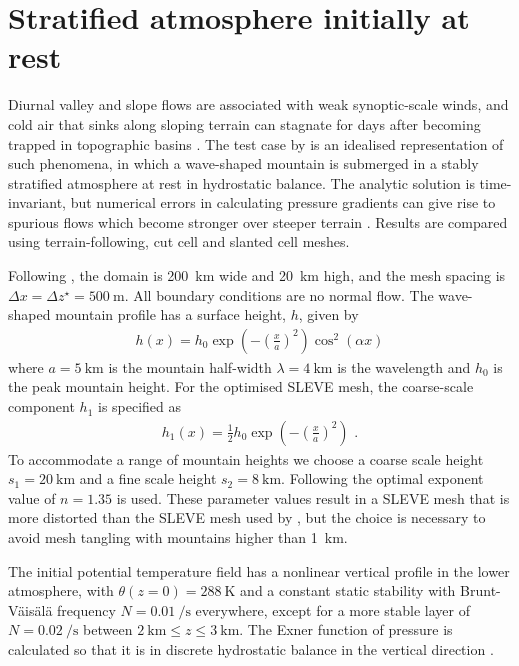 \section{Stratified atmosphere initially at rest}
\label{sec:slanted:resting}

Diurnal valley and slope flows are associated with weak synoptic-scale winds, and cold air that sinks along sloping terrain can stagnate for days after becoming trapped in topographic basins \citep{chow2013}.
The test case by \citet{klemp2011} is an idealised representation of such phenomena, in which a wave-shaped mountain is submerged in a stably stratified atmosphere at rest in hydrostatic balance.
The analytic solution is time-invariant, but numerical errors in calculating pressure gradients can give rise to spurious flows which become stronger over steeper terrain \citep{klemp2011}.
Results are compared using terrain-following, cut cell and slanted cell meshes.

Following \cite{klemp2011}, the domain is \SI{200}{\kilo\meter} wide and \SI{20}{\kilo\meter} high, and the mesh spacing is \(\Delta x = \Delta z^\star = \SI{500}{\meter}\).  All boundary conditions are no normal flow.
The wave-shaped mountain profile has a surface height, $h$, given by
\begin{align}
	h(x) = h_0 \exp \left( - \left( \frac{x}{a} \right)^2 \right) \cos^2 \left( \alpha x \right) \label{eqn:resting:mountain}
\end{align}
where $a = \SI{5}{\kilo\meter}$ is the mountain half-width $\lambda = \SI{4}{\kilo\meter}$ is the wavelength and $h_0$ is the peak mountain height.  For the optimised SLEVE mesh, the coarse-scale component $h_1$ is specified as
\begin{align}
	h_1(x) = \frac{1}{2} h_0 \exp \left( - \left( \frac{x}{a} \right)^2 \right) \text{ .}
\end{align}
To accommodate a range of mountain heights we choose a coarse scale height $s_1 = \SI{20}{\kilo\meter}$ and a fine scale height $s_2 = \SI{8}{\kilo\meter}$.  Following \citet{leuenberger2010} the optimal exponent value of $n = \num{1.35}$ is used.  These parameter values result in a SLEVE mesh that is more distorted than the SLEVE mesh used by \citet{klemp2011}, but the choice is necessary to avoid mesh tangling with mountains higher than \SI{1}{\kilo\meter}.

The initial potential temperature field has a nonlinear vertical profile in the lower atmosphere, with $\theta(z = 0) = \SI{288}{\kelvin}$ and a constant static stability with Brunt-V\"ais\"al\"a frequency $N = \SI{0.01}{\per\second}$ everywhere, except for a more stable layer of $N = \SI{0.02}{\per\second}$ between $\SI{2}{\kilo\meter} \leq z \leq \SI{3}{\kilo\meter}$.
The Exner function of pressure is calculated so that it is in discrete hydrostatic balance in the vertical direction \citep{weller-shahrokhi2014}.

